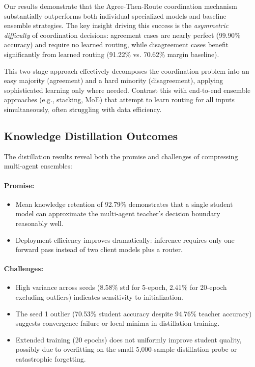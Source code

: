 \documentclass[12pt]{article}
\begin{document}
Our results demonstrate that the Agree-Then-Route coordination mechanism substantially outperforms both individual specialized models and baseline ensemble strategies. The key insight driving this success is the \textit{asymmetric difficulty} of coordination decisions: agreement cases are nearly perfect (99.90\% accuracy) and require no learned routing, while disagreement cases benefit significantly from learned routing (91.22\% vs. 70.62\% margin baseline).

This two-stage approach effectively decomposes the coordination problem into an easy majority (agreement) and a hard minority (disagreement), applying sophisticated learning only where needed. Contrast this with end-to-end ensemble approaches (e.g., stacking, MoE) that attempt to learn routing for all inputs simultaneously, often struggling with data efficiency.

\subsection{Knowledge Distillation Outcomes}

The distillation results reveal both the promise and challenges of compressing multi-agent ensembles:

\paragraph{Promise:}
\begin{itemize}
    \item Mean knowledge retention of 92.79\% demonstrates that a single student model can approximate the multi-agent teacher's decision boundary reasonably well.
    \item Deployment efficiency improves dramatically: inference requires only one forward pass instead of two client models plus a router.
\end{itemize}

\paragraph{Challenges:}
\begin{itemize}
    \item High variance across seeds (8.58\% std for 5-epoch, 2.41\% for 20-epoch excluding outliers) indicates sensitivity to initialization.
    \item The seed 1 outlier (70.53\% student accuracy despite 94.76\% teacher accuracy) suggests convergence failure or local minima in distillation training.
    \item Extended training (20 epochs) does not uniformly improve student quality, possibly due to overfitting on the small 5,000-sample distillation probe or catastrophic forgetting.
\end{itemize}
\end{document}

